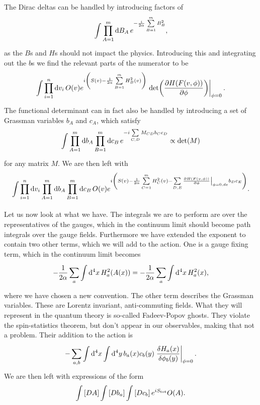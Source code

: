 The Dirac deltas can be handled by introducing factors of
\begin{align*}
	\int\limits_{}^{}\prod\limits_{A = 1}^{m}\dd{B_{A}}e^{-\frac{i}{2\alpha}\sum\limits_{B = 1}^{m}B_{B}^{2}},
\end{align*}
as the $B$s and $H$s should not impact the physics. Introducing this and integrating out the $b$s we find the relevant parts of the numerator to be
\begin{align*}
	\inte{}{}\prod\limits_{i = 1}^{n}\dd{v_{i}}O(v)e^{i\left(S(v) - \frac{1}{2\alpha}\sum\limits_{B = 1}^{m}H_{B}^{2}(v)\right)}\eval{\det(\pdv{H(F(v, \phi))}{\phi})}_{\phi = 0}.
\end{align*}
The functional determinant can in fact also be handled by introducing a set of Grassman variables $b_{A}$ and $c_{A}$, which satisfy
\begin{align*}
	\int\limits_{}^{}\prod\limits_{A = 1}^{m}\dd{b_{A}}\prod\limits_{B = 1}^{m}\dd{c_{B}}e^{-i\sum\limits_{C, D} M_{CD}b_{C}c_{D}} \propto \det(M)
\end{align*}
for any matrix $M$. We are then left with
\begin{align*}
	\inte{}{}\prod\limits_{i = 1}^{n}\dd{v_{i}}\prod\limits_{A = 1}^{m}\dd{b_{A}}\prod\limits_{B = 1}^{m}\dd{c_{B}}O(v)e^{i\left(S(v) - \frac{1}{2\alpha}\sum\limits_{C = 1}^{m}H_{C}^{2}(v) - \sum\limits_{D, E} \eval{\pdv{H(F(v, \phi))}{\phi}}_{\phi = 0, de}b_{D}c_{E}\right)}.
\end{align*}

Let us now look at what we have. The integrals we are to perform are over the representatives of the gauges, which in the continuum limit should become path integrals over the gauge fields. Furthermore we have extended the exponent to contain two other terms, which we will add to the action. One is a gauge fixing term, which in the continuum limit becomes
\begin{align*}
	-\frac{1}{2\alpha}\sum\limits_{a}\int\limits_{}^{}\dd[4]{x}H_{a}^{2}(A(x)) = -\frac{1}{2\alpha}\sum\limits_{a}\int\limits_{}^{}\dd[4]{x}H_{a}^{2}(x),
\end{align*}
where we have chosen a new convention. The other term describes the Grassman variables. These are Lorentz invariant, anti-commuting fields. What they will represent in the quantum theory is so-called Fadeev-Popov ghosts. They violate the spin-statistics theorem, but don't appear in our observables, making that not a problem. Their addition to the action is
\begin{align*}
	 - \sum\limits_{a, b}\integ[4]{}{}{x}{\integ[4]{}{}{y}{b_{a}(x)c_{b}(y)\eval{\fdv{H_{a}(x)}{\phi_{b}(y)}}_{\phi = 0}}}.
\end{align*}
We are then left with expressions of the form
\begin{align*}
	\int\limits_{}\left[DA\right]\int\limits_{}\left[Db_{a}\right]\int\limits_{}\left[Dc_{b}\right]e^{iS_{\text{tot}}}O(A).
\end{align*}

